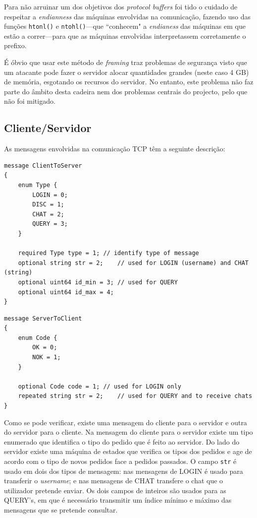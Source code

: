 \documentclass[a4paper]{article}
\begin{document}
	Para não arruinar um dos objetivos dos \textit{protocol buffers} foi tido o cuidado de respeitar a \textit{endianness} das máquinas envolvidas na comunicação, fazendo uso das funções \texttt{htonl()} e \texttt{ntohl()}---que ``conhecem" a \textit{endianess} das máquinas em que estão a correr---para que as máquinas envolvidas interpretassem corretamente o prefixo.

	É óbvio que usar este método de \textit{framing} traz problemas de segurança visto que um atacante pode fazer o servidor alocar quantidades grandes (neste caso 4 GB) de memória, esgotando os recursos do servidor. No entanto, este problema não faz parte do âmbito desta cadeira nem dos problemas centrais do projecto, pelo que não foi mitigado.

	\subsection{Cliente/Servidor}

	As mensagens envolvidas na comunicação TCP têm a seguinte descrição:

	\begin{verbatim}
message ClientToServer 
{ 
    enum Type { 
        LOGIN = 0; 
        DISC = 1; 
        CHAT = 2; 
        QUERY = 3; 
    } 
 
    required Type type = 1; // identify type of message 
    optional string str = 2;    // used for LOGIN (username) and CHAT (string) 
    optional uint64 id_min = 3; // used for QUERY 
    optional uint64 id_max = 4; 
}
	\end{verbatim}

	\begin{verbatim}
message ServerToClient 
{ 
    enum Code { 
        OK = 0; 
        NOK = 1; 
    } 
 
    optional Code code = 1; // used for LOGIN only 
    repeated string str = 2;    // used for QUERY and to receive chats 
}
	\end{verbatim}

	Como se pode verificar, existe uma mensagem do cliente para o servidor e outra do servidor para o cliente. Na mensagem do cliente para o servidor existe um tipo enumerado que identifica o tipo do pedido que é feito ao servidor. Do lado do servidor existe uma máquina de estados que verifica os tipos dos pedidos e age de acordo com o tipo de novos pedidos face a pedidos passados. O campo \texttt{str} é usado em dois dos tipos de mensagem: nas mensagens de LOGIN é usado para transferir o \textit{username}; e nas mensagens de CHAT transfere o chat que o utilizador pretende enviar. Os dois campos de inteiros são usados para as QUERY's, em que é necessário transmitir um índice mínimo e máximo das mensagens que se pretende consultar. 
\end{document}
